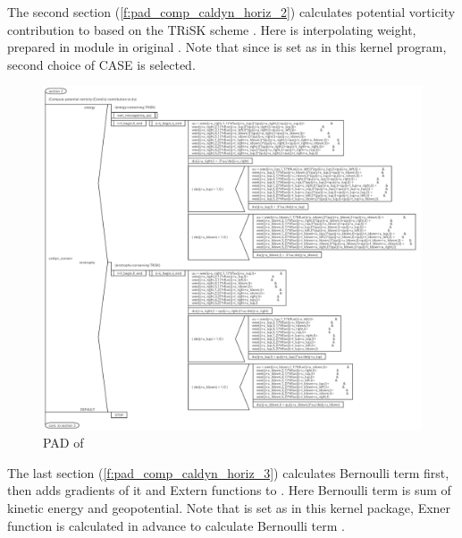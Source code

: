 The second section (\autoref{f:pad_comp_caldyn_horiz_2}) calculates potential
vorticity contribution to  based on the TRiSK scheme
\citep{Ringler:2010:UAE:1749635.1750220}.
%
Here  is interpolating weight, prepared in module
 in original \DYNAMICO.
%
Note that since  is set as
 in this kernel program, second choice of CASE is selected.


\begin{figure}[tbp]
\centering
\includegraphics[scale=.4]{figs/caldyn_horiz_sec2.pdf}
 \caption{PAD of }\label{f:pad_comp_caldyn_horiz_2}
\end{figure}

The last section (\autoref{f:pad_comp_caldyn_horiz_3}) calculates Bernoulli term
first, then adds gradients of it and Extern functions to .
%
Here Bernoulli term is sum of kinetic energy and geopotential.
%
Note that  is set as  in this kernel
package, Exner function  is calculated in advance to calculate
Bernoulli term .

